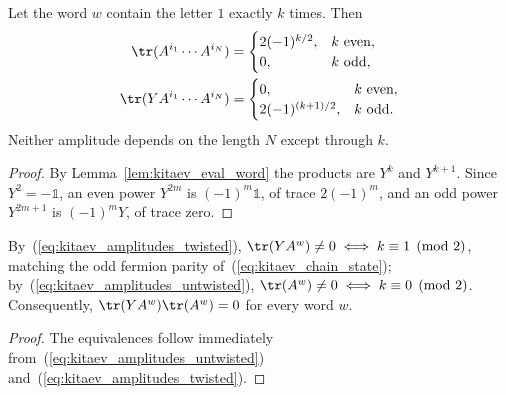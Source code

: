 \begin{lemma}\label{thm:kitaev_amplitudes}
    \leanok
    Let the word $w$ contain the letter $1$ exactly $k$ times. Then
    \begin{align}
        \tr(A^{i_1}\cdots A^{i_N})
         & =
        \begin{cases}
            2(-1)^{k/2}, & k \text{ even}, \\
            0,           & k \text{ odd},
        \end{cases}
        \label{eq:kitaev_amplitudes_untwisted} \\
        \tr(YA^{i_1}\cdots A^{i_N})
         & =
        \begin{cases}
            0,               & k \text{ even}, \\
            2(-1)^{(k+1)/2}, & k \text{ odd}.
        \end{cases}
        \label{eq:kitaev_amplitudes_twisted}
    \end{align}
    Neither amplitude depends on the length $N$ except through $k$.
\end{lemma}

\begin{proof}
    \leanok
    By Lemma~\ref{lem:kitaev_eval_word} the products are $Y^k$ and $Y^{k+1}$. Since
    $Y^2=-\mathbb 1$, an even power $Y^{2m}$ is $(-1)^m\mathbb 1$, of trace
    $2(-1)^m$, and an odd power $Y^{2m+1}$ is $(-1)^mY$, of trace zero.
\end{proof}

\begin{corollary}\label{cor:kitaev_parity_supports}
    \leanok
    By~(\ref{eq:kitaev_amplitudes_twisted}), $\tr(YA^w)\neq0 \iff k\equiv 1\pmod 2$,
    matching the odd fermion parity of~(\ref{eq:kitaev_chain_state});
    by~(\ref{eq:kitaev_amplitudes_untwisted}), $\tr(A^w)\neq0 \iff k\equiv 0\pmod 2$.
    Consequently, $\tr(YA^w)\tr(A^w)=0$ for every word $w$.
\end{corollary}

\begin{proof}
    \leanok
    The equivalences follow immediately from~(\ref{eq:kitaev_amplitudes_untwisted})
    and~(\ref{eq:kitaev_amplitudes_twisted}).
\end{proof}


